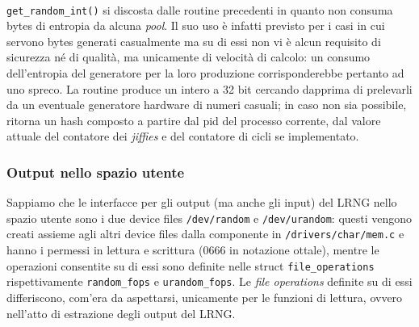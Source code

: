 \documentclass{article}
\begin{document}
 \paragraph{}\verb+get_random_int()+ si discosta dalle routine precedenti in
 quanto non consuma bytes di entropia da alcuna \emph{pool}. Il suo uso è
 infatti previsto per i casi in cui servono bytes generati casualmente ma su di
 essi non vi è alcun requisito di sicurezza né di qualità, ma unicamente di
 velocità di calcolo: un consumo dell'entropia del generatore per la loro
 produzione corrisponderebbe pertanto ad uno spreco. La routine produce un
 intero a 32 bit cercando dapprima di prelevarli da un eventuale generatore
 hardware di numeri casuali; in caso non sia possibile, ritorna un hash
 composto a partire dal pid del processo corrente, dal valore attuale del
 contatore dei \emph{jiffies} e del contatore di cicli se implementato.
 
  
\subsubsection{Output nello spazio utente}\label{outputUtente}
 
 Sappiamo che le interfacce per gli output (ma anche gli input) del LRNG nello
 spazio utente sono i due device files \verb+/dev/random+ e \verb+/dev/urandom+:
 questi vengono creati assieme agli altri device files dalla componente in
 \verb+/drivers/char/mem.c+ e hanno i permessi in lettura e scrittura (0666 in
 notazione ottale), mentre le operazioni consentite su di essi sono definite
 nelle struct \verb+file_operations+ rispettivamente \verb+random_fops+ e
 \verb+urandom_fops+. Le \emph{file operations} definite su di essi
 differiscono, com'era da aspettarsi, unicamente per le funzioni di lettura,
 ovvero nell'atto di estrazione degli output del LRNG.
 
\end{document}
